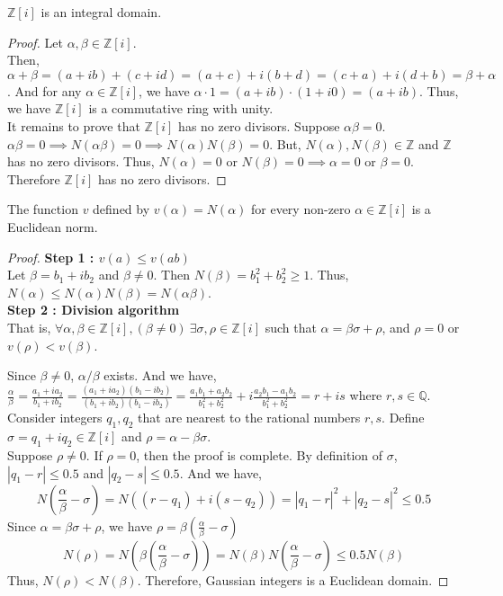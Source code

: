 \begin{lemma}
	$\mathbb{Z}[i]$ is an integral domain.
\end{lemma}
\begin{proof}
	Let $\alpha, \beta \in \mathbb{Z}[i]$.\\
	Then, $\alpha + \beta = (a+ib) + (c+id) = (a+c) + i(b+d) = (c+a) + i(d+b) = \beta + \alpha$.
	And for any $\alpha \in \mathbb{Z}[i]$, we have $\alpha \cdot 1 = (a+ib) \cdot (1+i0) = (a+ib)$.
	Thus, we have $\mathbb{Z}[i]$ is a commutative ring with unity.\\

	It remains to prove that $\mathbb{Z}[i]$ has no zero divisors.
	Suppose $\alpha\beta = 0$.
	$\alpha\beta = 0 \implies N(\alpha\beta) = 0 \implies N(\alpha) N(\beta) = 0$.
	But, $N(\alpha),N(\beta) \in \mathbb{Z}$ and $\mathbb{Z}$ has no zero divisors.
	Thus, $N(\alpha) = 0$ or $N(\beta) = 0 \implies \alpha = 0$ or $\beta = 0$.
	Therefore $\mathbb{Z}[i]$ has no zero divisors.
\end{proof}

\begin{theorem}
	The function $v$ defined by $v(\alpha) = N(\alpha)$ for every non-zero $\alpha \in \mathbb{Z}[i]$ is a Euclidean norm.
\end{theorem}
\begin{proof}
	\textbf{Step 1 : $v(a) \le v(ab)$}\\
	Let $\beta = b_1 + ib_2$ and $\beta \ne 0$.
	Then $N(\beta) = b_1^2+b_2^2 \ge 1$.
	Thus, $N(\alpha) \le N(\alpha)N(\beta) = N(\alpha\beta)$.\\

	\textbf{Step 2 : Division algorithm}\\
	That is, $\forall \alpha,\beta \in \mathbb{Z}[i],(\beta \ne 0)\ \exists \sigma,\rho \in \mathbb{Z}[i]$ such that $\alpha = \beta\sigma+\rho$, and $\rho = 0$ or $v(\rho) < v(\beta)$.

	Since $\beta \ne 0$, $\alpha/\beta$ exists.
	And we have, $\frac{\alpha}{\beta} = \frac{a_1+ia_2}{b_1+ib_2} = \frac{(a_1+ia_2)(b_1-ib_2)}{(b_1+ib_2)(b_1-ib_2)} = \frac{a_1b_1+a_2b_2}{b_1^2+b_2^2} + i \frac{a_2b_1-a_1b_2}{b_1^2+b_2^2} = r+is$ where $r,s \in \mathbb{Q}$.
	Consider integers $q_1,q_2$ that are nearest to the rational numbers $r,s$.
	Define $\sigma = q_1 + iq_2 \in \mathbb{Z}[i]$ and $\rho = \alpha - \beta\sigma$.\\

	Suppose $\rho \ne 0$.
	If $\rho = 0$, then the proof is complete.
	By definition of $\sigma$, $|q_1-r| \le 0.5$ and $|q_2-s| \le 0.5$.
	And we have,
	\[ N \left(\frac{\alpha}{\beta} - \sigma \right) = N((r-q_1)+i(s-q_2)) = |q_1-r|^2 + |q_2-s|^2 \le 0.5 \]
	Since $\alpha = \beta\sigma + \rho$,
	we have $\rho = \beta(\frac{\alpha}{\beta}-\sigma)$
	\[N(\rho) = N \left( \beta \left(\frac{\alpha}{\beta}-\sigma \right) \right) = N(\beta) N \left(\frac{\alpha}{\beta}-\sigma\right) \le 0.5N(\beta)\]
	Thus, $N(\rho) < N(\beta)$.
	Therefore, Gaussian integers is a Euclidean domain.
\end{proof}

